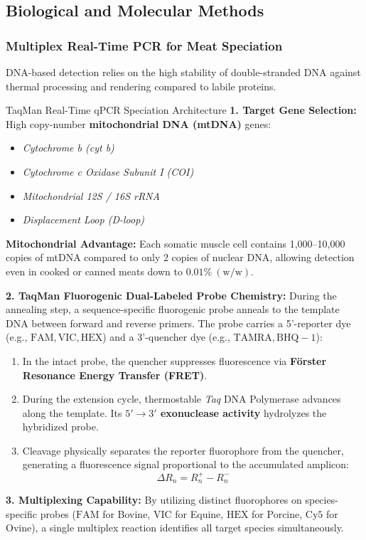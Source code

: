 \documentclass[11pt,a4paper,oneside]{article}
\begin{document}
\subsection{Biological and Molecular Methods}

\subsubsection{Multiplex Real-Time PCR for Meat Speciation}
DNA-based detection relies on the high stability of double-stranded DNA against thermal processing and rendering compared to labile proteins.

\begin{mechanismbox}{TaqMan Real-Time qPCR Speciation Architecture}
\textbf{1. Target Gene Selection:} High copy-number \textbf{mitochondrial DNA (mtDNA)} genes:
\begin{itemize}
    \item \textit{Cytochrome b (cyt b)}
    \item \textit{Cytochrome c Oxidase Subunit I (COI)}
    \item \textit{Mitochondrial 12S / 16S rRNA}
    \item \textit{Displacement Loop (D-loop)}
\end{itemize}
\textbf{Mitochondrial Advantage:} Each somatic muscle cell contains 1,000--10,000 copies of mtDNA compared to only 2 copies of nuclear DNA, allowing detection even in cooked or canned meats down to \textbf{$0.01\%\ (\text{w/w})$}.

\textbf{2. TaqMan Fluorogenic Dual-Labeled Probe Chemistry:}
During the annealing step, a sequence-specific fluorogenic probe anneals to the template DNA between forward and reverse primers. The probe carries a 5'-reporter dye (e.g., $\mathrm{FAM, VIC, HEX}$) and a 3'-quencher dye (e.g., $\mathrm{TAMRA, BHQ-1}$):
\begin{enumerate}
    \item In the intact probe, the quencher suppresses fluorescence via \textbf{Förster Resonance Energy Transfer (FRET)}.
    \item During the extension cycle, thermostable \textit{Taq} DNA Polymerase advances along the template. Its \textbf{$5' \to 3'$ exonuclease activity} hydrolyzes the hybridized probe.
    \item Cleavage physically separates the reporter fluorophore from the quencher, generating a fluorescence signal proportional to the accumulated amplicon:
    $$\Delta R_n = R_n^+ - R_n^-$$
\end{enumerate}
\textbf{3. Multiplexing Capability:} By utilizing distinct fluorophores on species-specific probes ($\mathrm{FAM}$ for Bovine, $\mathrm{VIC}$ for Equine, $\mathrm{HEX}$ for Porcine, $\mathrm{Cy5}$ for Ovine), a single multiplex reaction identifies all target species simultaneously.
\end{mechanismbox}
\end{document}
